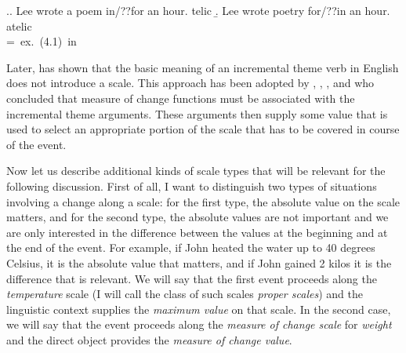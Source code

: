
\ex.\label{ex:Kennedy1}\a. Lee wrote a poem in/??for an hour. \hfill telic
\b. Lee wrote poetry for/??in an hour. \hfill atelic\\
\hbox{}\hfill\hbox{= ex.~(4.1) in \citealt[103]{Kennedy:12}}


%

Later, \citet{Filip:05} has shown that the basic meaning of an incremental theme verb in English does not introduce a scale. This approach has been adopted by \citet{Rappaport:08}, \citet{LevinRappaport:10}, \citet{Kennedy:12}, and \citet{Bochnak:13} who concluded that measure of change functions must be associated with the incremental theme arguments. These arguments then supply some value that is used to select an appropriate portion of the scale that has to be covered in course of the event. 

Now let us describe additional kinds of scale types that will be relevant for the following discussion. First of all, I want to distinguish two types of situations involving a change along a scale: for the first type, the absolute value on the scale matters, and for the second type, the absolute values are not important and we are only interested in the difference between the values at the beginning and at the end of the event. For example, if John heated the water up to 40 degrees Celsius, it is the absolute value that matters, and if John gained 2 kilos it is the difference that is relevant. We will say that the first event proceeds along the \textit{temperature} scale (I will call the class of such scales \textit{proper scales}) and the linguistic context   supplies the \textit{maximum value} on that scale. In the second case, we will say that the event proceeds along the \textit{measure of change scale} for \textit{weight} and the direct object provides the \textit{measure of change value}. 


